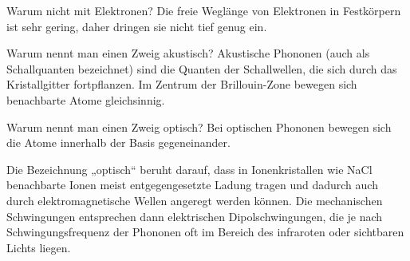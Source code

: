 \begin{fquestion}{Warum nicht mit Elektronen?}
    Die freie Weglänge von Elektronen in Festkörpern ist sehr gering, daher dringen sie nicht tief genug ein. 
\end{fquestion}

\begin{fquestion}{Warum nennt man einen Zweig akustisch?}
    Akustische Phononen (auch als Schallquanten bezeichnet) sind die Quanten der Schallwellen, die sich durch das Kristallgitter fortpflanzen. 
    Im Zentrum der Brillouin-Zone bewegen sich benachbarte Atome gleichsinnig.
\end{fquestion}

\begin{fquestion}{Warum nennt man einen Zweig optisch?}
    Bei optischen Phononen bewegen sich die Atome innerhalb der Basis gegeneinander. 
    
    Die Bezeichnung „optisch“ beruht darauf, dass in Ionenkristallen wie NaCl benachbarte Ionen meist entgegengesetzte Ladung tragen und dadurch auch durch elektromagnetische Wellen angeregt werden können. 
    Die mechanischen Schwingungen entsprechen dann elektrischen Dipolschwingungen, die je nach Schwingungsfrequenz der Phononen oft im Bereich des infraroten oder sichtbaren Lichts liegen.
\end{fquestion}

